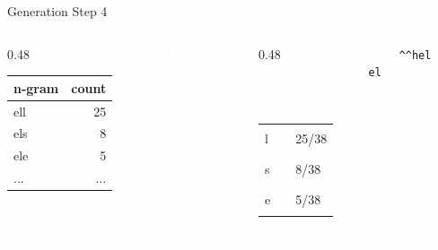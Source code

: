 \documentclass[aspectratio=169]{beamer}
\renewcommand{\textbf}[1]{\textcolor{white}{\bfseries #1}}
\begin{document}
\begin{frame}[c,fragile]{Generation Step 4}
\begin{columns}[c]
\begin{column}{0.48\textwidth}
\textbf{Trigrams starting with ``el'':}

\vspace{0.5em}
\begin{tabular}{|l|r|}
\hline
\rowcolor{codebg}
n-gram & count \\
\hline
ell & 25 \\
els & 8 \\
ele & 5 \\
... & ... \\
\hline
\end{tabular}

\vspace{0.5em}
\textbf{Total: 38}
\end{column}

\begin{column}{0.48\textwidth}
\textbf{Generated so far:} \texttt{\textasciicircum\textasciicircum hel}\\
\textbf{Current context:} \texttt{el}

\vspace{0.5em}
\textbf{Probabilities:}

\begin{tabular}{@{}l@{ }l@{ }l@{}}
l & \textcolor{miamired}{\rule{4.0cm}{0.3cm}} & 25/38 \\
s & \textcolor{miamired}{\rule{1.6cm}{0.3cm}} & 8/38 \\
e & \textcolor{miamired}{\rule{1.0cm}{0.3cm}} & 5/38
\end{tabular}

\vspace{0.5em}
\textbf{Selected: l}
\end{column}
\end{columns}
\end{frame}
\end{document}
